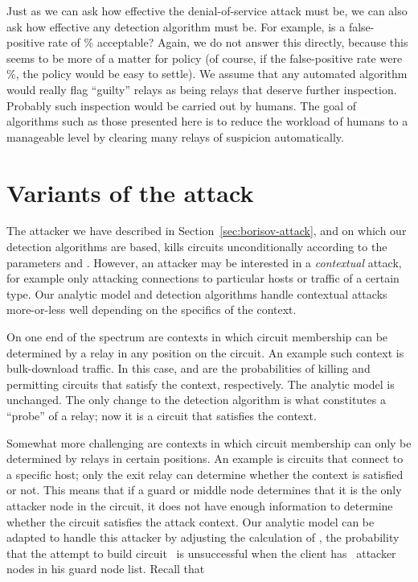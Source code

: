 \documentclass[]{lmcs}
\begin{document}
Just as we can ask how effective the denial-of-service attack must be,
we can also ask how effective any detection algorithm must be.  For example,
is a false-positive rate of \% acceptable?  Again, we do not answer
this directly, because this seems to be more of a matter for policy
(of course, if the false-positive rate were \%, the policy would
be easy to settle).  We assume that any automated algorithm would really
flag ``guilty'' relays as being relays that deserve further inspection.
Probably such inspection would be carried out by humans.  The goal of
algorithms such as those presented here is to reduce the workload of
humans to a manageable level by clearing many relays of suspicion
automatically.

\section{Variants of the attack}
\label{sec:variants}

The attacker we have described in Section~\ref{sec:borisov-attack},
and on which our detection algorithms are based, kills circuits
unconditionally according to the parameters  and .
However, an attacker may be interested in a \emph{contextual} attack,
for example only attacking connections to particular hosts or traffic
of a certain type.  Our analytic model and detection algorithms
handle contextual attacks more-or-less well depending on the
specifics of the context.

On one end of the spectrum are contexts in which circuit membership
can be determined by a relay in any position on the circuit.
An example such context is bulk-download traffic.  In this case,
 and  are the probabilities of killing and
permitting circuits that satisfy the context, respectively.
The analytic model is unchanged.  The only change to the detection
algorithm is what constitutes a ``probe'' of a relay; now it is a
circuit that satisfies the context.

Somewhat more challenging are contexts in which circuit membership 
can only be determined by relays in certain positions.  An example
is circuits that connect to a specific host; only the exit relay
can determine whether the context is satisfied or not.
This means that if a guard or middle
node determines that it is the only attacker node in the circuit,
it does not have enough information to determine whether the circuit
satisfies the attack context.  Our analytic model can be adapted to
handle this attacker by adjusting the calculation of , the
probability that the attempt to build circuit~
is unsuccessful when the client
has ~attacker nodes in his guard node list.  Recall that
\end{document}
